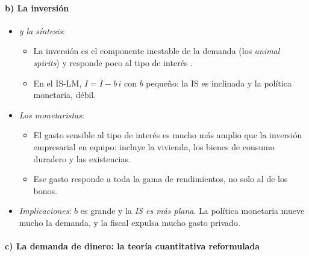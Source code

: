 \documentclass[11pt]{article}
\begin{document}
\paragraph{b) La inversión}

\begin{itemize}
\item \emph{ y la síntesis}:
  \begin{itemize}
  \item La inversión es el componente inestable de la demanda (los \emph{animal spirits}) y responde poco al tipo de interés .
  \item En el IS-LM, $I=\overline{I}-b\,i$ con $b$ pequeño: la IS es inclinada y la política monetaria, débil.
  \end{itemize}
\item \emph{Los monetaristas}:
  \begin{itemize}
  \item El gasto sensible al tipo de interés es mucho más amplio que la inversión empresarial en equipo: incluye la vivienda, los bienes de consumo duradero y las existencias.
  \item Ese gasto responde a toda la gama de rendimientos, no solo al de los bonos.
  \end{itemize}
\item \emph{Implicaciones}: $b$ es grande y la \emph{IS es más plana}. La política monetaria mueve mucho la demanda, y la fiscal expulsa mucho gasto privado.
\end{itemize}

\paragraph{c) La demanda de dinero: la teoría cuantitativa reformulada}
\end{document}
